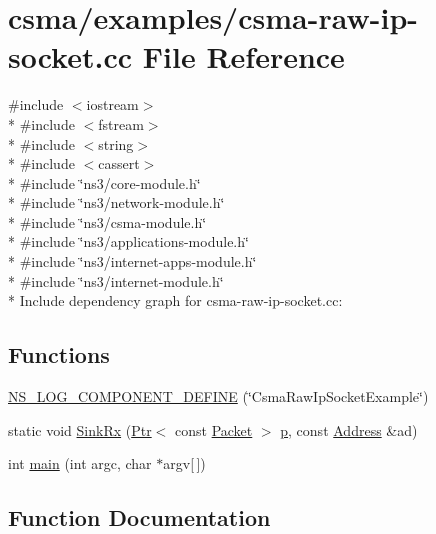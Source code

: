 \hypertarget{csma-raw-ip-socket_8cc}{}\section{csma/examples/csma-\/raw-\/ip-\/socket.cc File Reference}
\label{csma-raw-ip-socket_8cc}
{\ttfamily \#include $<$iostream$>$}\\*
{\ttfamily \#include $<$fstream$>$}\\*
{\ttfamily \#include $<$string$>$}\\*
{\ttfamily \#include $<$cassert$>$}\\*
{\ttfamily \#include \char`\"{}ns3/core-\/module.\+h\char`\"{}}\\*
{\ttfamily \#include \char`\"{}ns3/network-\/module.\+h\char`\"{}}\\*
{\ttfamily \#include \char`\"{}ns3/csma-\/module.\+h\char`\"{}}\\*
{\ttfamily \#include \char`\"{}ns3/applications-\/module.\+h\char`\"{}}\\*
{\ttfamily \#include \char`\"{}ns3/internet-\/apps-\/module.\+h\char`\"{}}\\*
{\ttfamily \#include \char`\"{}ns3/internet-\/module.\+h\char`\"{}}\\*
Include dependency graph for csma-\/raw-\/ip-\/socket.cc\+:
\subsection*{Functions}
\begin{DoxyCompactItemize}
\item 
\hyperlink{csma-raw-ip-socket_8cc_aa35056e5750a17b8130cf0d457567a9f}{N\+S\+\_\+\+L\+O\+G\+\_\+\+C\+O\+M\+P\+O\+N\+E\+N\+T\+\_\+\+D\+E\+F\+I\+NE} (\char`\"{}Csma\+Raw\+Ip\+Socket\+Example\char`\"{})
\item 
static void \hyperlink{csma-raw-ip-socket_8cc_ab5a3a26cb523a53ed19ba80dcbb97d11}{Sink\+Rx} (\hyperlink{classns3_1_1Ptr}{Ptr}$<$ const \hyperlink{classns3_1_1Packet}{Packet} $>$ \hyperlink{lte__link__budget__x2__handover__measures_8m_ac9de518908a968428863f829398a4e62}{p}, const \hyperlink{classns3_1_1Address}{Address} \&ad)
\item 
int \hyperlink{csma-raw-ip-socket_8cc_a0ddf1224851353fc92bfbff6f499fa97}{main} (int argc, char $\ast$argv\mbox{[}$\,$\mbox{]})
\end{DoxyCompactItemize}


\subsection{Function Documentation}
